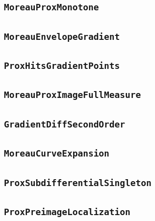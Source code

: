 \documentclass[11pt]{amsart}
\theoremstyle{definition}
\begin{document}
\subsection{\texorpdfstring{\texttt{MoreauProxMonotone}}{MoreauProxMonotone}}\label{node:MoreauProxMonotone}


\subsection{\texorpdfstring{\texttt{MoreauEnvelopeGradient}}{MoreauEnvelopeGradient}}\label{node:MoreauEnvelopeGradient}


\subsection{\texorpdfstring{\texttt{ProxHitsGradientPoints}}{ProxHitsGradientPoints}}\label{node:ProxHitsGradientPoints}


\subsection{\texorpdfstring{\texttt{MoreauProxImageFullMeasure}}{MoreauProxImageFullMeasure}}\label{node:MoreauProxImageFullMeasure}


\subsection{\texorpdfstring{\texttt{GradientDiffSecondOrder}}{GradientDiffSecondOrder}}\label{node:GradientDiffSecondOrder}


\subsection{\texorpdfstring{\texttt{MoreauCurveExpansion}}{MoreauCurveExpansion}}\label{node:MoreauCurveExpansion}


\subsection{\texorpdfstring{\texttt{ProxSubdifferentialSingleton}}{ProxSubdifferentialSingleton}}\label{node:ProxSubdifferentialSingleton}


\subsection{\texorpdfstring{\texttt{ProxPreimageLocalization}}{ProxPreimageLocalization}}\label{node:ProxPreimageLocalization}

\end{document}
